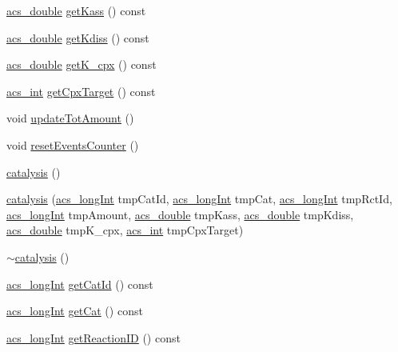 \begin{DoxyCompactItemize}
\hyperlink{a00050_ab776853a005fcbf56af0424a2a4dd607}{acs\+\_\+double} \hyperlink{a00011_a471d98737d6708b3ac03efba41082d0c}{get\+Kass} () const 
\item 
\hyperlink{a00050_ab776853a005fcbf56af0424a2a4dd607}{acs\+\_\+double} \hyperlink{a00011_ad8b0d5f6410e2256cfefe0db9a10b0af}{get\+Kdiss} () const 
\item 
\hyperlink{a00050_ab776853a005fcbf56af0424a2a4dd607}{acs\+\_\+double} \hyperlink{a00011_a182bfb05b12ddd3613693f6d1f362665}{get\+K\+\_\+cpx} () const 
\item 
\hyperlink{a00050_a8d277355641a098190360234e2ebde35}{acs\+\_\+int} \hyperlink{a00011_a95cce06ac3f63b66d984bd723ab7e561}{get\+Cpx\+Target} () const 
\item 
void \hyperlink{a00011_a9c90e6f2cd9aafd2029ef20a09b95eb2}{update\+Tot\+Amount} ()
\item 
void \hyperlink{a00011_ab8964f8ec17d677de03747520d0a9995}{reset\+Events\+Counter} ()
\item 
\hyperlink{a00011_a7c4d1a67d2745293a17a6bee0df7c5cd}{catalysis} ()
\item 
\hyperlink{a00011_ab6af429c051e2bc9756bac72b99cc4ce}{catalysis} (\hyperlink{a00050_a19319d75f02db4308bc5c0026d98cd85}{acs\+\_\+long\+Int} tmp\+Cat\+Id, \hyperlink{a00050_a19319d75f02db4308bc5c0026d98cd85}{acs\+\_\+long\+Int} tmp\+Cat, \hyperlink{a00050_a19319d75f02db4308bc5c0026d98cd85}{acs\+\_\+long\+Int} tmp\+Rct\+Id, \hyperlink{a00050_a19319d75f02db4308bc5c0026d98cd85}{acs\+\_\+long\+Int} tmp\+Amount, \hyperlink{a00050_ab776853a005fcbf56af0424a2a4dd607}{acs\+\_\+double} tmp\+Kass, \hyperlink{a00050_ab776853a005fcbf56af0424a2a4dd607}{acs\+\_\+double} tmp\+Kdiss, \hyperlink{a00050_ab776853a005fcbf56af0424a2a4dd607}{acs\+\_\+double} tmp\+K\+\_\+cpx, \hyperlink{a00050_a8d277355641a098190360234e2ebde35}{acs\+\_\+int} tmp\+Cpx\+Target)
\item 
\hyperlink{a00011_a982805165c59e95ac055dc24e684fa05}{$\sim$catalysis} ()
\item 
\hyperlink{a00050_a19319d75f02db4308bc5c0026d98cd85}{acs\+\_\+long\+Int} \hyperlink{a00011_a85ba5bd9c758392f245f1277141a1706}{get\+Cat\+Id} () const 
\item 
\hyperlink{a00050_a19319d75f02db4308bc5c0026d98cd85}{acs\+\_\+long\+Int} \hyperlink{a00011_a205e222dff1e80ff8f3195ab22e78726}{get\+Cat} () const 
\item 
\hyperlink{a00050_a19319d75f02db4308bc5c0026d98cd85}{acs\+\_\+long\+Int} \hyperlink{a00011_a6e0eea2f12109b36bb522ac971d1db29}{get\+Reaction\+I\+D} () const 

\end{DoxyCompactItemize}
